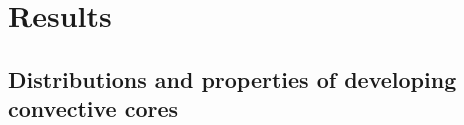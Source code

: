 


\section{Results}


\subsection{Distributions and properties of developing convective cores} \label{sec:core_properties}

